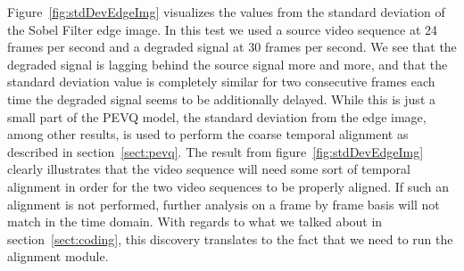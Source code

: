 Figure~\ref{fig:stdDevEdgeImg} visualizes the values from the standard deviation of the Sobel Filter edge image. In this test we used a source video sequence at 24 frames per second and a degraded signal at 30 frames per second. We see that the degraded signal is lagging behind the source signal more and more, and that the standard deviation value is completely similar for two consecutive frames each time the degraded signal seems to be additionally delayed. While this is just a small part of the PEVQ model, the standard deviation from the edge image, among other results, is used to perform the coarse temporal alignment as described in section~\ref{sect:pevq}. The result from figure~\ref{fig:stdDevEdgeImg} clearly illustrates that the video sequence will need some sort of temporal alignment in order for the two video sequences to be properly aligned. If such an alignment is not performed, further analysis on a frame by frame basis will not match in the time domain.  With regards to what we talked about in section~\ref{sect:coding}, this discovery translates to the fact that we need to run the alignment module. 
